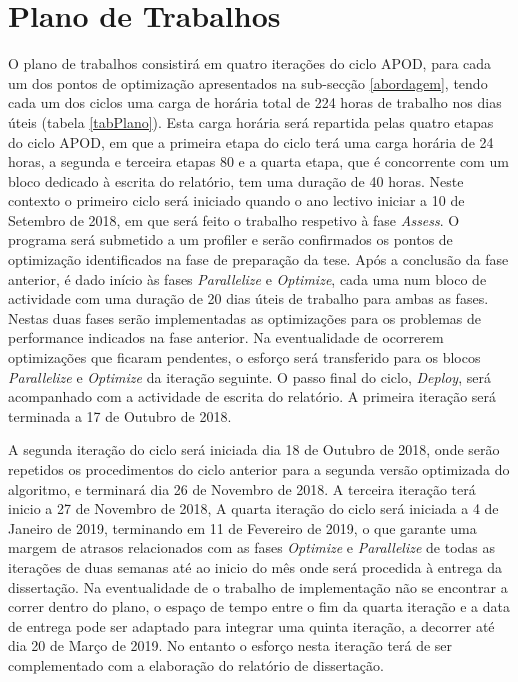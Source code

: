\section{Plano de Trabalhos} %
O plano de trabalhos consistirá em quatro iterações do ciclo APOD, para cada um dos pontos de optimização apresentados na sub-secção \ref{abordagem}, tendo cada um dos ciclos uma carga de horária total de 224 horas de trabalho nos dias úteis (tabela \ref{tabPlano}). Esta carga horária será repartida pelas quatro etapas do ciclo APOD, em que a primeira etapa do ciclo terá uma carga horária de 24 horas, a segunda e terceira etapas 80 e a quarta etapa, que é concorrente com um bloco dedicado à escrita do relatório, tem uma duração de 40 horas. Neste contexto o primeiro ciclo será iniciado quando o ano lectivo iniciar a 10 de Setembro de 2018, em que será feito o trabalho respetivo à fase \textit{Assess}. O programa será submetido a um profiler e serão confirmados os pontos de optimização identificados na fase de preparação da tese. Após a conclusão da fase anterior, é dado início às fases \textit{Parallelize} e \textit{Optimize}, cada uma num bloco de actividade com uma duração de 20 dias úteis de trabalho para ambas as fases. Nestas duas fases serão implementadas as optimizações para os problemas de performance indicados na fase anterior. Na eventualidade de ocorrerem optimizações que ficaram pendentes, o esforço será transferido para os blocos \textit{Parallelize} e \textit{Optimize} da iteração seguinte. O passo final do ciclo, \textit{Deploy}, será acompanhado com a actividade de escrita do relatório. A primeira iteração será terminada a 17 de Outubro de 2018.  \par 
A segunda iteração do ciclo será iniciada dia 18 de Outubro de 2018, onde serão repetidos os procedimentos do ciclo anterior para a segunda versão optimizada do algoritmo, e terminará dia 26 de Novembro de 2018. A terceira iteração terá inicio a 27 de Novembro de 2018, 
A quarta iteração do ciclo será iniciada a 4 de Janeiro de 2019,  terminando em 11 de Fevereiro de 2019, o que garante uma margem de atrasos relacionados com as fases \textit{Optimize} e \textit{Parallelize} de todas as iterações de duas semanas até ao inicio do mês onde será procedida à entrega da dissertação. Na eventualidade de o trabalho de implementação não se encontrar a correr dentro do plano, o espaço de tempo entre o fim da quarta iteração e a data de entrega pode ser adaptado para integrar uma quinta iteração, a decorrer até dia 20 de Março de 2019. No entanto o esforço nesta iteração terá de ser complementado com a elaboração do relatório de dissertação.
